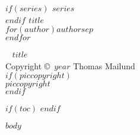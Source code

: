 \documentclass[11pt, openright, twoside, onecolumn, final]{memoir} %
\begin{document}
\frontmatter


\begingroup
\thispagestyle{empty}
{\bfseries\sffamily\noindent
$if(series)$ {\large $series$}\\[50pt]$endif$ %
{\huge $title$}\\[35pt] %
{\Large $for(author)$$author$$sep$\\$endfor$} %
}
\vfill
\endgroup



\newpage
~\vfill
\thispagestyle{empty}
{\Large $title$}\\[15pt] %
\noindent Copyright \copyright\ $year$ Thomas Mailund\\ %
$if(piccopyright)$\\[5pt]$piccopyright$\\ $endif$
\clearpage


$if(toc)$
\setcounter{tocdepth}{1}
\pagestyle{empty} %
\tableofcontents %
\cleardoublepage %
$endif$



\mainmatter
$body$

\end{document}
